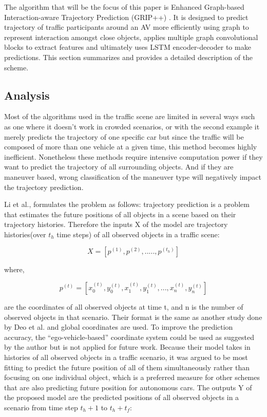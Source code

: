 \tab The algorithm that will be the focus of this paper is Enhanced Graph-based Interaction-aware Trajectory Prediction (GRIP++) \cite{li2020gripplus}. It is designed to predict trajectory of traffic participants around an AV more efficiently using graph to represent interaction amongst close objects, applies multiple graph convolutional blocks to extract features and ultimately uses LSTM encoder-decoder to make predictions. This section summarizes and provides a detailed description of the scheme.

\subsection{Analysis}

\tab Most of the algorithms used in the traffic scene are limited in several ways such as one where it doesn’t work in crowded scenarios, or with the second example it merely predicts the trajectory of one specific car but since the traffic will be composed of more than one vehicle at a given time, this method becomes highly inefficient. Nonetheless these methods require intensive computation power if they want to predict the trajectory of all surrounding objects. And if they are maneuver based, wrong classification of the maneuver type will negatively impact the trajectory prediction.

\tab Li et al., formulates the problem as follows: trajectory prediction is a problem that estimates the future positions of all objects in a scene based on their trajectory histories. Therefore the inputs X of the model are trajectory histories(over \(t_h\) time steps) of all observed objects in a traffic scene:

\begin{equation}
    X = [p^{(1)}, p^{(2)},.....,p^{(t_h)}]
\end{equation}

where,

\begin{equation}
    p^{(t)} = [x_0^{(t)}, y_0^{(t)}, x_1^{(t)}, y_1^{(t)}, ... ,x_n^{(t)}, y_n^{(t)}]
\end{equation}


are the coordinates of all observed objects at time t, and n is the number of observed objects in that scenario. Their format is the same as another study done by Deo et al. and global coordinates are used. To improve the prediction accuracy, the “ego-vehicle-based” coordinate system could be used as suggested by the author but is not applied for future work. 
Because their model takes in histories of all observed objects in a traffic scenario, it was argued to be most fitting to predict the future position of all of them simultaneously rather than focusing on one individual object, which is a preferred measure for other schemes that are also predicting future position for autonomous cars. The outputs Y of the proposed model are the predicted positions of all observed objects in a scenario from time step \(t_h + 1\) to \(t_h+ t_f :\)

